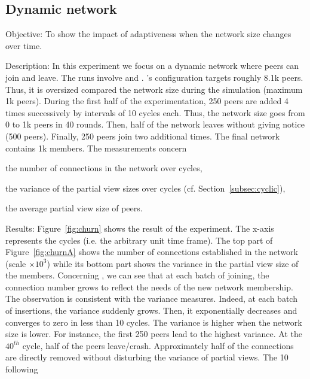 \subsection{Dynamic network}

\begin{asparadesc}
\item[Objective:] To show the impact of adaptiveness when the network size
  changes over time.
\item[Description:] In this experiment we focus on a dynamic network where
  peers can join and leave. The runs involve \CYCLON and \SPRAY. \CYCLON's
  configuration targets roughly 8.1k peers. Thus, it is oversized compared the
  network size during the simulation (maximum 1k peers). During the first half
  of the experimentation, 250 peers are added 4 times successively by intervals
  of 10 cycles each. Thus, the network size goes from 0 to 1k peers in 40
  rounds. Then, half of the network leaves without giving notice (500
  peers). Finally, 250 peers join two additional times. The final network
  contains 1k members. The measurements concern
  \begin{inparaenum}
  \item the number of connections in the network over cycles,
  \item the variance of the partial view sizes over cycles
    (cf. Section~\ref{subsec:cyclic}),
  \item the average partial view size of peers.
  \end{inparaenum}
\item[Results:] Figure~\ref{fig:churn} shows the result of the experiment. The
  x-axis represents the cycles (i.e. the arbitrary unit time frame). The top
  part of Figure~\ref{fig:churnA} shows the number of connections established
  in the network (scale $\times 10^3$) while its bottom part shows the variance
  in the partial view size of the members. Concerning \SPRAY, we can see that
  at each batch of joining, the connection number grows to reflect the needs
  of the new network membership. The observation is consistent with the
  variance measures. Indeed, at each batch of insertions, the variance suddenly
  grows. Then, it exponentially decreases and converges to zero in less than 10
  cycles. The variance is higher when the network size is lower. For instance,
  the first 250 peers lead to the highest variance. At the $40^{th}$ cycle,
  half of the peers leave/crash. Approximately half of the connections are directly
  removed without disturbing the variance of partial views. The 10 following

\end{asparadesc}
